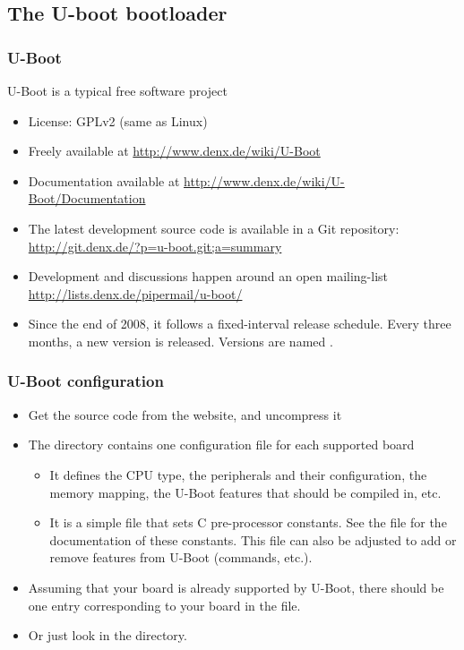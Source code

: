 \subsection{The U-boot bootloader}

\begin{frame}
  \frametitle{U-Boot}
  U-Boot is a typical free software project
  \begin{itemize}
  \item License: GPLv2 (same as Linux)
  \item Freely available at \url{http://www.denx.de/wiki/U-Boot}
  \item Documentation available at
    \url{http://www.denx.de/wiki/U-Boot/Documentation}
  \item The latest development source code is available in a Git
    repository:
    \url{http://git.denx.de/?p=u-boot.git;a=summary}
  \item Development and discussions happen around an open mailing-list
    \url{http://lists.denx.de/pipermail/u-boot/}
  \item Since the end of 2008, it follows a fixed-interval release
    schedule. Every three months, a new version is released. Versions
    are named .
\end{itemize}
\end{frame}

\begin{frame}
  \frametitle{U-Boot configuration}
  \begin{itemize}
  \item Get the source code from the website, and uncompress it
  \item The  directory contains one
    configuration file for each supported board
    \begin{itemize}
    \item It defines the CPU type, the peripherals and their configuration, the
      memory mapping, the U-Boot features that should be compiled in, etc.
    \item It is a simple  file that sets C pre-processor
      constants. See the  file for the documentation of
      these constants. This file can also be adjusted to add or remove
      features from U-Boot (commands, etc.).
    \end{itemize}
  \item Assuming that your board is already supported by U-Boot, there
    should be one entry corresponding to your board in the
     file.
  \item Or just look in the  directory.
  \end{itemize}
\end{frame}

